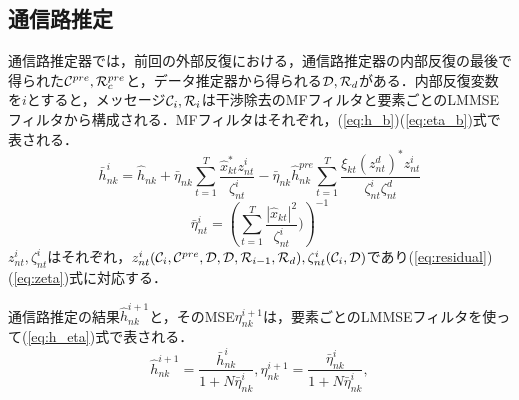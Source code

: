 \documentclass{jarticle}
\begin{document}
\subsection{通信路推定}
通信路推定器では，前回の外部反復における，通信路推定器の内部反復の最後で得られた${\cal C}^{pre},{\cal R}_{c}^{pre}$と，データ推定器から得られる${\cal D},{\cal R}_{d}$がある．内部反復変数を$i$とすると，メッセージ${\cal C}_{i},{\cal R}_{i}$は干渉除去のMFフィルタと要素ごとのLMMSEフィルタから構成される．MFフィルタはそれぞれ，(\ref{eq:h_b})(\ref{eq:eta_b})式で表される．
\begin{equation}
    \label{eq:h_b}
    \bar{h}_{nk}^{i} = \hat{h}_{nk} + \bar{\eta}_{nk}\sum_{t=1}^{T}\frac{\hat{x}^{*}_{kt}z^{i}_{nt}}{\zeta_{nt}^{i}} - \bar{\eta}_{nk}\hat{h}^{pre}_{nk}\sum_{t=1}^{T}
    \frac{\xi_{kt}(z^{d}_{nt})^{*}z_{nt}^{i}}
        {\zeta_{nt}^{i}\zeta_{nt}^{d}}
\end{equation}
\begin{equation}
    \label{eq:eta_b}
    \bar{\eta}_{nt}^{i}=  \left(\sum_{t=1}^{T}\frac{|\hat{x}_{kt}|^{2}}{\zeta_{nt}^{i}})\right)^{-1}
\end{equation}
$z^{i}_{nt},\zeta_{nt}^{i}$はそれぞれ，$z^{i}_{nt}({\cal C}_{i},{\cal C}^{pre},{\cal D},{\cal D},{\cal R}_{i-1},{\cal R}_{d}),\zeta_{nt}^{i}({\cal C}_{i},{\cal D})$であり(\ref{eq:residual})(\ref{eq:zeta})式に対応する．

通信路推定の結果$\hat{h}_{nk}^{i+1}$と，そのMSE$\eta_{nk}^{i+1}$は，要素ごとのLMMSEフィルタを使って(\ref{eq:h_eta})式で表される．
\begin{equation}
    \label{eq:h_eta}
    \hat{h}_{nk}^{i+1} = \frac{\bar{h}_{nk}^{i}}{1 + N\bar{\eta}_{nk}^{i}},
    \eta_{nk}^{i+1} = \frac{\bar{\eta}_{nk}^{i}}{1 + N\bar{\eta}_{nk}^{i}},
\end{equation}
\end{document}
